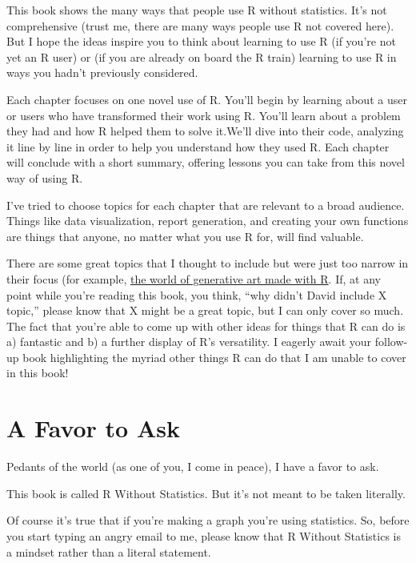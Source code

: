 \documentclass[
]{book}
\begin{document}
This book shows the many ways that people use R without statistics. It's not comprehensive (trust me, there are many ways people use R not covered here). But I hope the ideas inspire you to think about learning to use R (if you're not yet an R user) or (if you are already on board the R train) learning to use R in ways you hadn't previously considered.

Each chapter focuses on one novel use of R. You'll begin by learning about a user or users who have transformed their work using R. You'll learn about a problem they had and how R helped them to solve it.We'll dive into their code, analyzing it line by line in order to help you understand how they used R. Each chapter will conclude with a short summary, offering lessons you can take from this novel way of using R.

I've tried to choose topics for each chapter that are relevant to a broad audience. Things like data visualization, report generation, and creating your own functions are things that anyone, no matter what you use R for, will find valuable.

There are some great topics that I thought to include but were just too narrow in their focus (for example, \href{https://blog.djnavarro.net/posts/2021-10-19_rtistry-posts/}{the world of generative art made with R}. If, at any point while you're reading this book, you think, ``why didn't David include X topic,'' please know that X might be a great topic, but I can only cover so much. The fact that you're able to come up with other ideas for things that R can do is a) fantastic and b) a further display of R's versatility. I eagerly await your follow-up book highlighting the myriad other things R can do that I am unable to cover in this book!

\hypertarget{a-favor-to-ask}{%
\section*{A Favor to Ask}\label{a-favor-to-ask}}

Pedants of the world (as one of you, I come in peace), I have a favor to ask.

This book is called R Without Statistics. But it's not meant to be taken literally.

Of course it's true that if you're making a graph you're using statistics. So, before you start typing an angry email to me, please know that R Without Statistics is a mindset rather than a literal statement.
\end{document}
